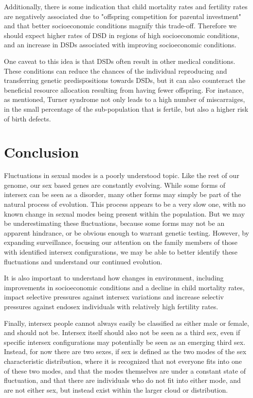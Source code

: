 \documentclass{article}
\begin{document}
Additionally, there is some indication that child mortality rates and fertility rates are negatively associated due to "offspring competition for parental investment" and that better socioeconomic conditions magnify this trade-off\cite{Lawson2012}. Therefore we should expect higher rates of DSD in regions of high socioeconomic conditions, and an increase in DSDs associated with improving socioeconomic conditions. 

One caveat to this idea is that DSDs often result in other medical conditions. These conditions can reduce the chances of the individual reproducing and transferring genetic predispositions towards DSDs, but it can also counteract the beneficial resource allocation resulting from having fewer offspring. For instance, as mentioned, Turner syndrome not only leads to a high number of miscarraiges, in the small percentage of the sub-population that is fertile, but also a higher risk of birth defects. 
\section{Conclusion}
Fluctuations in sexual modes is a poorly understood topic. Like the rest of our genome, our sex based genes are constantly evolving. While some forms of intersex can be seen as a disorder, many other forms may simply be part of the natural process of evolution. This process appears to be a very slow one, with no known change in sexual modes being present within the population. But we may be underestimating these fluctuations, because some forms may not be an apparent hindrance, or be obvious enough to warrant genetic testing. However, by expanding surveillance, focusing our attention on the family members of those with identified intersex configurations, we may be able to better identify these fluctuations and understand our continued evolution. 

It is also important to understand how changes in environment, including improvements in socioeconomic conditions and a decline in child mortality rates, impact selective pressures against intersex variations and increase selectiv pressures against endosex individuals with relatively high fertility rates. 

Finally, intersex people cannot always easily be classified as either male or female, and should not be. Intersex itself should also not be seen as a third sex, even if specific intersex configurations may potentially be seen as an emerging third sex. Instead, for now there are two sexes, if sex is defined as the two modes of the sex characteristic distribution, where it is recognized that not everyone fits into one of these two modes, and that the modes themselves are under a constant state of fluctuation, and that there are individuals who do not fit into either mode, and are not either sex, but instead exist within the larger cloud or distribution.
\printbibliography
\end{document}
